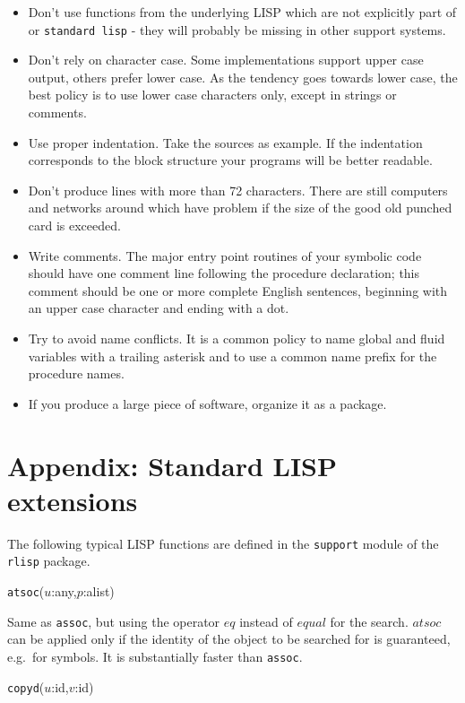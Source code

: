 \begin{itemize}
\item Don't use functions from the underlying LISP which are
  not explicitly part of {\reduce} or {\tt standard lisp}
  - they will probably be missing in other support systems.
\item Don't rely on character case. 
  Some implementations support upper case
  output, others prefer lower case. As the tendency goes
  towards lower case, the best policy is to use lower
  case characters only, except in strings or comments.
\item Use proper indentation. Take the {\reduce}
  sources as example. If the indentation corresponds
  to the block structure your programs will be better
  readable.
\item Don't produce lines with more than 72 characters.
  There are still computers and networks around which
  have problem if the size of the good old punched card
  is exceeded.
\item Write comments. The major entry point routines of your
  symbolic code should have one comment line following the
  procedure declaration; this comment should be one or more
  complete English sentences, beginning with an upper case
  character and ending with a dot.
\item Try to avoid name conflicts. It is a common policy to
  name global and fluid variables with a trailing asterisk
  and to use a common name prefix for the procedure names.
\item If you produce a large piece of software, organize it as
  a {\reduce} package.
\end{itemize}

 
\section{Appendix: Standard LISP extensions}

The following typical LISP functions are defined in the {\tt support}
module of the {\tt rlisp}  package.

\vspace{5mm}    
{\tt atsoc}($u$:any,$p$:alist)

\noindent
Same as {\tt assoc}, but using the operator $eq$ instead of $equal$
for the search. $atsoc$ can be applied only if the identity
of the object to be searched for is guaranteed, e.g.\  for symbols.
It is substantially faster than {\tt assoc}.

\vspace{5mm}    
{\tt copyd}($u$:id,$v$:id)


